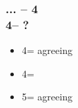 \documentclass[12pt, a4paper]{article}
\begin{document}
\subsubsection*{... -- 4\diams\\
                4\hearts -- ?}
\begin{itemize}
    \item 4\spades = agreeing \clubs
    \item 4\nt = \soff
    \item 5\clubs = agreeing \diams
\end{itemize}
\end{document}

